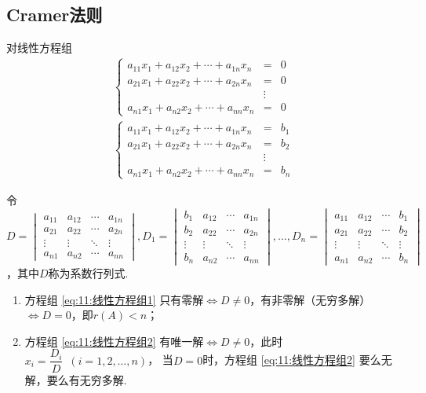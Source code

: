 \subsection{Cramer法则}
\begin{theorem}  \label{thm:11:Cramer}
    对线性方程组
    \begin{gather}
        \label{eq:11:线性方程组1}
        \left\{ \begin{array}{rcl}
            a_{11}x_1+a_{12}x_2+\cdots+a_{1n}x_n&=&0 \\
            a_{21}x_1+a_{22}x_2+\cdots+a_{2n}x_n&=&0 \\
            &\vdots& \\
            a_{n1}x_1+a_{n2}x_2+\cdots+a_{nn}x_n&=&0
        \end{array} \right.
        \\
        \label{eq:11:线性方程组2}
        \left\{ \begin{array}{rcl}
            a_{11}x_1+a_{12}x_2+\cdots+a_{1n}x_n&=&b_1 \\
            a_{21}x_1+a_{22}x_2+\cdots+a_{2n}x_n&=&b_2 \\
            &\vdots& \\
            a_{n1}x_1+a_{n2}x_2+\cdots+a_{nn}x_n&=&b_n
        \end{array} \right.
    \end{gather}

    令$D=\begin{vmatrix}
        a_{11} & a_{12} & \cdots & a_{1n} \\
        a_{21} & a_{22} & \cdots & a_{2n} \\
        \vdots & \vdots & \ddots & \vdots \\
        a_{n1} & a_{n2} & \cdots & a_{nn}
    \end{vmatrix},D_1=\begin{vmatrix}
        b_1 & a_{12} & \cdots & a_{1n} \\
        b_2 & a_{22} & \cdots & a_{2n} \\
        \vdots & \vdots & \ddots & \vdots \\
        b_n & a_{n2} & \cdots & a_{nn}
    \end{vmatrix},\ldots,D_n=\begin{vmatrix}
        a_{11} & a_{12} & \cdots & b_1 \\
        a_{21} & a_{22} & \cdots & b_2 \\
        \vdots & \vdots & \ddots & \vdots \\
        a_{n1} & a_{n2} & \cdots & b_n
    \end{vmatrix}$，其中$D$称为系数行列式.
    \begin{enumerate}
        \item 方程组 \ref{eq:11:线性方程组1} 只有零解$\iff D \neq 0$，有非零解（无穷多解）$\iff D=0$，即$r(A)<n$；

        \item 方程组 \ref{eq:11:线性方程组2} 有唯一解$\iff D \neq 0$，此时$x_i=\dfrac{D_i}{D}\enspace(i=1,2,\ldots,n)$，
        当$D=0$时，方程组 \ref{eq:11:线性方程组2} 要么无解，要么有无穷多解.
    \end{enumerate}
\end{theorem}
